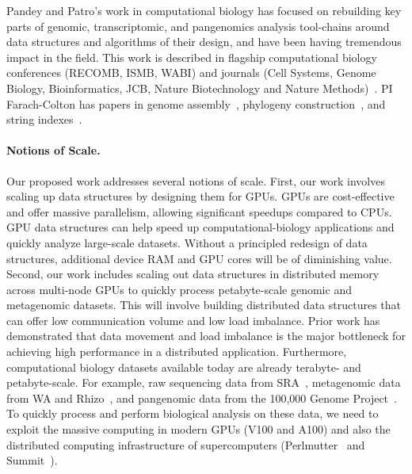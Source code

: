 \begin{description}
    \item[Large-scale computational biology (PIs Bender, Farach-Colton, Pandey and Patro)] Pandey and Patro's work in computational biology has focused on rebuilding key parts of genomic, transcriptomic, and pangenomics analysis tool-chains around data structures and algorithms of their design, and have been having tremendous impact in the field. This work is described in flagship computational biology conferences (RECOMB, ISMB, WABI) and journals (Cell Systems, Genome Biology, Bioinformatics, JCB, Nature Biotechnology and Nature Methods)~\cite{PandeyABFJP18Cell,PandeyBJP17a,PandeyBJP17b,AlmodaresiPFJP19,AlmodaresiPFJP20,pandey2021variantstore,almodaresi2017rainbowfish,almodaresi2022incrementally,PatroSailfish:2014,Patro2017Salmon,Srivastava2019,he2022alevin,Almodaresi2018Pufferfish,Almodaresi2021}.  PI Farach-Colton has papers in genome assembly~\cite{Choi2003}, phylogeny construction~\cite{Farach97,Ambainis97,FarachKKM97,Farach1999, Cohen1997}, and string indexes~\cite{Farach97,Ambainis97}.

\end{description}


\paragraph{Notions of Scale.}
Our proposed work addresses several notions of scale.
First, our work involves scaling up data structures by designing them for GPUs. GPUs are cost-effective and offer massive parallelism, allowing significant speedups compared to CPUs. GPU data structures can help speed up computational-biology applications
and quickly analyze large-scale datasets. Without a principled redesign of data structures, additional device RAM and GPU cores will be of diminishing value.
Second, our work includes scaling out data structures in distributed memory across multi-node GPUs to quickly process petabyte-scale genomic and metagenomic datasets. This will involve building distributed data structures that can offer low communication volume and low load imbalance. Prior work has demonstrated that data movement and load imbalance is the major bottleneck for achieving high performance in a distributed application.
Furthermore, computational biology datasets available today are already terabyte- and petabyte-scale. For example, raw sequencing data from SRA~\cite{kodama2012sequence}, metagenomic data from WA and Rhizo~\cite{hofmeyr2020terabase}, and pangenomic data from the 100,000 Genome Project~\cite{1002021100}. 
To quickly process and perform biological analysis on these data, we need to exploit the massive computing in modern GPUs (V100 and A100) and also the distributed computing infrastructure of supercomputers (Perlmutter~\cite{perlmutter} and Summit~\cite{summit}).
